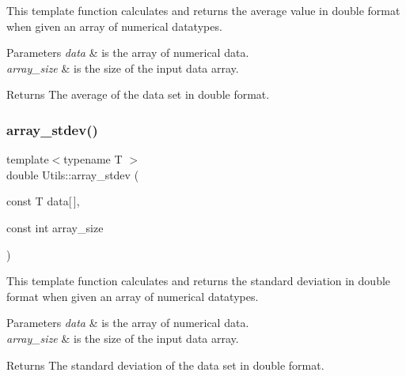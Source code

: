 This template function calculates and returns the average value in double format when given an array of numerical datatypes. 


\begin{DoxyParams}{Parameters}
{\em data} & is the array of numerical data. \\
\hline
{\em array\+\_\+size} & is the size of the input data array. \\
\hline
\end{DoxyParams}
\begin{DoxyReturn}{Returns}
The average of the data set in double format. 
\end{DoxyReturn}
\mbox{\label{namespace_utils_a25d09c704b5ae03f01cf76b6de10aa19}} 
\subsubsection{\texorpdfstring{array\+\_\+stdev()}{array\_stdev()}}
{\footnotesize\ttfamily template$<$typename T $>$ \\
double Utils\+::array\+\_\+stdev (\begin{DoxyParamCaption}\item[{const T}]{data\mbox{[}$\,$\mbox{]},  }\item[{const int}]{array\+\_\+size }\end{DoxyParamCaption})}



This template function calculates and returns the standard deviation in double format when given an array of numerical datatypes. 


\begin{DoxyParams}{Parameters}
{\em data} & is the array of numerical data. \\
\hline
{\em array\+\_\+size} & is the size of the input data array. \\
\hline
\end{DoxyParams}
\begin{DoxyReturn}{Returns}
The standard deviation of the data set in double format. 
\end{DoxyReturn}
\mbox{\label{namespace_utils_adcb2e98774b12bc12264034913547a2c}} 
